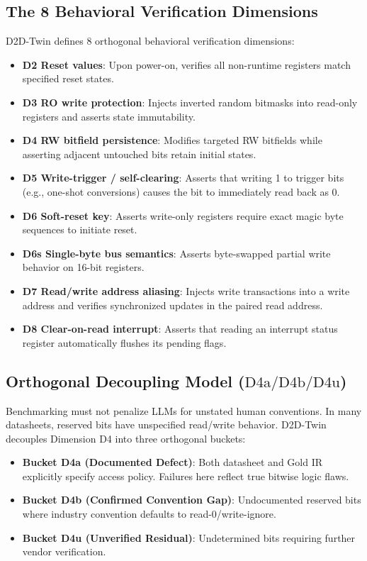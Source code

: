 \documentclass[conference]{IEEEtran}
\begin{document}
\subsection{The 8 Behavioral Verification Dimensions}
D2D-Twin defines 8 orthogonal behavioral verification dimensions:
\begin{itemize}
    \item \textbf{D2 Reset values}: Upon power-on, verifies all non-runtime registers match specified reset states.
    \item \textbf{D3 RO write protection}: Injects inverted random bitmasks into read-only registers and asserts state immutability.
    \item \textbf{D4 RW bitfield persistence}: Modifies targeted RW bitfields while asserting adjacent untouched bits retain initial states.
    \item \textbf{D5 Write-trigger / self-clearing}: Asserts that writing 1 to trigger bits (e.g., one-shot conversions) causes the bit to immediately read back as 0.
    \item \textbf{D6 Soft-reset key}: Asserts write-only registers require exact magic byte sequences to initiate reset.
    \item \textbf{D6s Single-byte bus semantics}: Asserts byte-swapped partial write behavior on 16-bit registers.
    \item \textbf{D7 Read/write address aliasing}: Injects write transactions into a write address and verifies synchronized updates in the paired read address.
    \item \textbf{D8 Clear-on-read interrupt}: Asserts that reading an interrupt status register automatically flushes its pending flags.
\end{itemize}

\subsection{\texorpdfstring{Orthogonal Decoupling Model ($\text{D4a} / \text{D4b} / \text{D4u}$)}{Orthogonal Decoupling Model (D4a / D4b / D4u)}}
Benchmarking must not penalize LLMs for unstated human conventions. In many datasheets, reserved bits have unspecified read/write behavior. D2D-Twin decouples Dimension D4 into three orthogonal buckets:
\begin{itemize}
    \item \textbf{Bucket D4a (Documented Defect)}: Both datasheet and Gold IR explicitly specify access policy. Failures here reflect true bitwise logic flaws.
    \item \textbf{Bucket D4b (Confirmed Convention Gap)}: Undocumented reserved bits where industry convention defaults to read-0/write-ignore.
    \item \textbf{Bucket D4u (Unverified Residual)}: Undetermined bits requiring further vendor verification.
\end{itemize}
\end{document}
